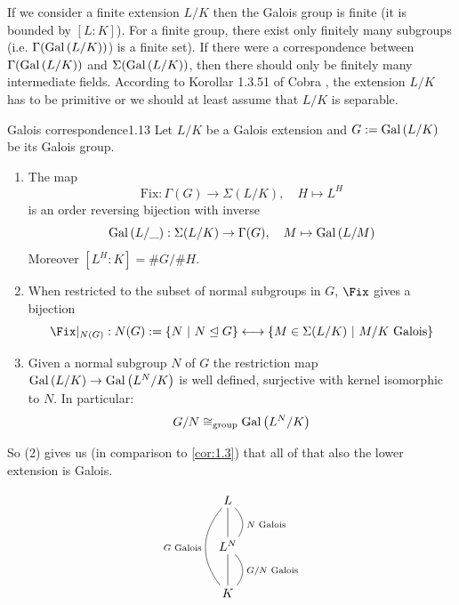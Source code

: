 \documentclass[twoside = false,	%
		headsepline,		%
		parskip = true,
		]{scrbook}						%
\begin{document}
        If we consider a finite extension $L/K$ then the Galois group is finite (it is bounded by $[L:K]$). For a finite group, there exist only finitely many subgroups (i.e. $\Gamma(\mathrm{Gal}\left( L/K\right))$) is a finite set). If there were a correspondence between $\Gamma(\mathrm{Gal}\left( L/K\right))$ and $\Sigma(\mathrm{Gal}\left( L/K\right))$, then there should only be finitely many intermediate fields. According to Korollar 1.3.51 of Cobra \cite{Cobra}, the extension $L/K$ has to be primitive or we should at least assume that $L/K$ is separable.
        
        \begin{theorem}{Galois correspondence}{1.13}
            Let $L/K$ be a Galois extension and $G:= \mathrm{Gal}\left( L/K\right)$ be its Galois group.
            \begin{enumerate}
                \item The map \[\mathrm{Fix}: \Gamma(G) \rightarrow \Sigma(L/K), \quad H \mapsto L^H\] is an order reversing bijection with inverse \[\mathrm{Gal}\left( L/\_\right): \Sigma(L/K) \rightarrow \Gamma(G), \quad M \mapsto \mathrm{Gal}\left( L/M\right)\] Moreover $[L^H:K] = \#G/\#H$.
                \item When restricted to the subset of normal subgroups in $G$, $\Fix$ gives a bijection
                \[\Fix|_{N(G)}: N(G):= \{ N \ | \ N \trianglelefteq G\} \longleftrightarrow \{M \in \Sigma(L/K) \ | \ M/K \text{ Galois}\}\]
                \item Given a normal subgroup $N$ of $G$ the restriction map $\mathrm{Gal}\left( L/K\right) \rightarrow \mathrm{Gal}\left( L^N/K\right)$ is well defined, surjective with kernel isomorphic to $N$. In particular:
                \begin{equation*}
                    G/N \cong_{\text{group}} \mathrm{Gal}\left( L^N/K\right)
                \end{equation*}
            \end{enumerate}
        \end{theorem}
        
        So (2) gives us (in comparison to \ref{cor:1.3}) that all of that also the lower extension is Galois.
        
        \begin{equation*}
            \xymatrix
            {
            L\ar@{-}[d]\ar@/_1.5pc/@{-}[dd]_{G\text{ Galois}}
            \ar@/^1pc/@{-}[d]^{N \text{ Galois}}\\
            L^N\ar@{-}[d]\ar@/^1pc/@{-}[d]^{G/N\text{ Galois}} \\
            K
            }
        \end{equation*}
        
\end{document}
